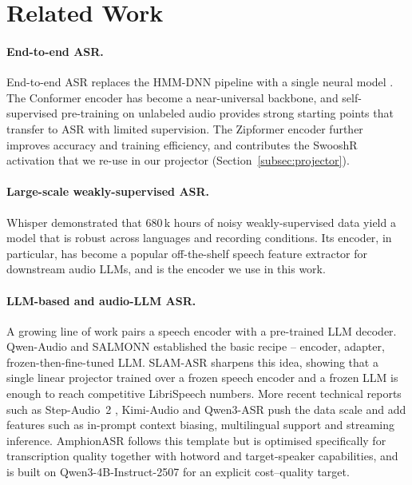 \section{Related Work}
\label{sec:related}

\paragraph{End-to-end ASR.}
End-to-end ASR replaces the HMM-DNN pipeline with a single neural model
\cite{graves2006ctc, graves2012rnnt, chan2016las}. The Conformer
encoder \cite{gulati2020conformer} has become a near-universal
backbone, and self-supervised pre-training on unlabeled audio
\cite{baevski2020wav2vec2, hsu2021hubert} provides strong starting
points that transfer to ASR with limited supervision. The Zipformer
encoder \cite{yao2024zipformer} further improves accuracy and
training efficiency, and contributes the SwooshR activation that we
re-use in our projector (Section~\ref{subsec:projector}).

\paragraph{Large-scale weakly-supervised ASR.}
Whisper \cite{radford2023whisper} demonstrated that 680\,k hours of
noisy weakly-supervised data yield a model that is robust across
languages and recording conditions. Its encoder, in particular, has
become a popular off-the-shelf speech feature extractor for downstream
audio LLMs, and is the encoder we use in this work.

\paragraph{LLM-based and audio-LLM ASR.}
A growing line of work pairs a speech encoder with a pre-trained LLM
decoder. Qwen-Audio \cite{chu2023qwenaudio} and
SALMONN \cite{tang2024salmonn} established the basic recipe -- encoder,
adapter, frozen-then-fine-tuned LLM. SLAM-ASR \cite{ma2024slamasr}
sharpens this idea, showing that a single linear projector trained over
a frozen speech encoder and a frozen LLM is enough to reach competitive
LibriSpeech numbers. More recent technical reports such as
Step-Audio~2 \cite{stepaudio22025}, Kimi-Audio \cite{kimiaudio2025}
and Qwen3-ASR \cite{qwen2025qwen3asr} push the data scale and add
features such as in-prompt context biasing, multilingual support and
streaming inference. AmphionASR follows this template but is optimised
specifically for transcription quality together with hotword and
target-speaker capabilities, and is built on Qwen3-4B-Instruct-2507
\cite{qwen2025qwen3} for an explicit cost--quality target.

